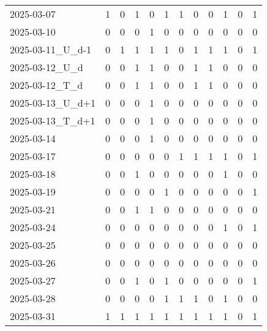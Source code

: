 \documentclass[dvipdfmx,oneside]{article}
\begin{document}
\begin{tabular}{lccccccccccc}
        2025-03-07 &     1 &     0 &     1 &     0 &     1 &     1 &     0 &     0 &     1 &     0 &     1 \\
        2025-03-10 &     0 &     0 &     0 &     1 &     0 &     0 &     0 &     0 &     0 &     0 &     0 \\
2025-03-11\_U\_d-1 &     0 &     1 &     1 &     1 &     1 &     0 &     1 &     1 &     1 &     0 &     1 \\
  2025-03-12\_U\_d &     0 &     0 &     1 &     1 &     0 &     0 &     1 &     1 &     0 &     0 &     0 \\
  2025-03-12\_T\_d &     0 &     0 &     1 &     1 &     0 &     0 &     1 &     1 &     0 &     0 &     0 \\
2025-03-13\_U\_d+1 &     0 &     0 &     0 &     1 &     0 &     0 &     0 &     0 &     0 &     0 &     0 \\
2025-03-13\_T\_d+1 &     0 &     0 &     0 &     1 &     0 &     0 &     0 &     0 &     0 &     0 &     0 \\
        2025-03-14 &     0 &     0 &     0 &     1 &     0 &     0 &     0 &     0 &     0 &     0 &     0 \\
        2025-03-17 &     0 &     0 &     0 &     0 &     0 &     1 &     1 &     1 &     1 &     0 &     1 \\
        2025-03-18 &     0 &     0 &     1 &     0 &     0 &     0 &     0 &     0 &     1 &     0 &     0 \\
        2025-03-19 &     0 &     0 &     0 &     0 &     1 &     0 &     0 &     0 &     0 &     0 &     1 \\
        2025-03-21 &     0 &     0 &     1 &     1 &     0 &     0 &     0 &     0 &     0 &     0 &     0 \\
        2025-03-24 &     0 &     0 &     0 &     0 &     0 &     0 &     0 &     0 &     1 &     0 &     1 \\
        2025-03-25 &     0 &     0 &     0 &     0 &     0 &     0 &     0 &     0 &     0 &     0 &     0 \\
        2025-03-26 &     0 &     0 &     0 &     0 &     0 &     0 &     0 &     0 &     0 &     0 &     0 \\
        2025-03-27 &     0 &     0 &     1 &     0 &     1 &     0 &     0 &     0 &     0 &     0 &     1 \\
        2025-03-28 &     0 &     0 &     0 &     0 &     1 &     1 &     1 &     0 &     1 &     0 &     0 \\
        2025-03-31 &     1 &     1 &     1 &     1 &     1 &     1 &     1 &     1 &     1 &     0 &     1 \\

\end{tabular}
\end{document}

